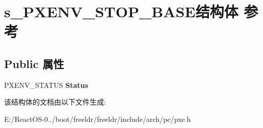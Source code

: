 \hypertarget{structs___p_x_e_n_v___s_t_o_p___b_a_s_e}{}\section{s\+\_\+\+P\+X\+E\+N\+V\+\_\+\+S\+T\+O\+P\+\_\+\+B\+A\+S\+E结构体 参考}
\label{structs___p_x_e_n_v___s_t_o_p___b_a_s_e}
\subsection*{Public 属性}
\begin{DoxyCompactItemize}
\item 
\mbox{\label{structs___p_x_e_n_v___s_t_o_p___b_a_s_e_a04464048e0303612a1e19d82ab6192fc}} 
P\+X\+E\+N\+V\+\_\+\+S\+T\+A\+T\+US {\bfseries Status}
\end{DoxyCompactItemize}


该结构体的文档由以下文件生成\+:\begin{DoxyCompactItemize}
\item 
E\+:/\+React\+O\+S-\/0../boot/freeldr/freeldr/include/arch/pc/pxe.\+h\end{DoxyCompactItemize}
